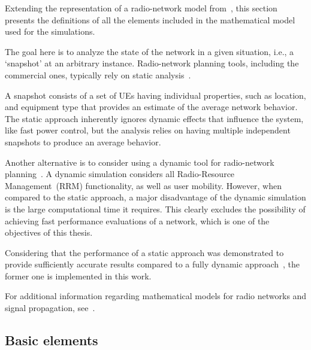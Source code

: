 Extending the representation of a radio-network model from~\cite{Nawrocki-Understanding_UMTS_radio_network_modelling_and_optimisation:2006},
this section presents the definitions of all the elements included
in the mathematical model used for the simulations.

The goal here is to analyze the state of the network in a given situation,
i.e., a \textquoteleft{}snapshot\textquoteright{} at an arbitrary
instance. Radio-network planning tools, including the commercial ones,
typically rely on static analysis~\cite{Niemela-Performance_of_static_WCDMA_simulator:2005}.

A snapshot consists of a set of UEs having individual properties,
such as location, and equipment type that provides an estimate of
the average network behavior. The static approach inherently ignores
dynamic effects that influence the system, like fast power control,
but the analysis relies on having multiple independent snapshots to
produce an average behavior.

Another alternative is to consider using a dynamic tool for radio-network
planning~\cite{Hamalainen-Advanced_WCDMA_radio_network_simulator:1999,Hoppe-Fast_planning_of_efficient_WCDMA_radio_networks:2001}.
A dynamic simulation considers all Radio-Resource Management~(RRM)
functionality, as well as user mobility. However, when compared to
the static approach, a major disadvantage of the dynamic simulation
is the large computational time it requires. This clearly excludes
the possibility of achieving fast performance evaluations of a network,
which is one of the objectives of this thesis.

Considering that the performance of a static approach was demonstrated
to provide sufficiently accurate results compared to a fully dynamic
approach~\cite{RadioNetworkPlanningAndOptimisationForUMTS,Laiho-Verification_of_WCDMA_network_planning_prediction_with_dynamic_simulations:2001},
the former one is implemented in this work.

For additional information regarding mathematical models for radio
networks and signal propagation, see~\cite{RadioNetworkPlanningAndOptimisationForUMTS,Nawrocki-Understanding_UMTS_radio_network_modelling_and_optimisation:2006,Stuber-Principles_of_mobile_communication:2011}.


\subsection{Basic elements}


